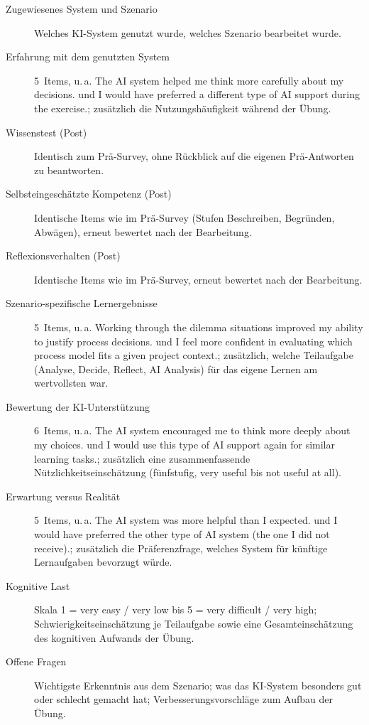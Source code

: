 \begin{description}
    \item[Zugewiesenes System und Szenario] Welches KI-System genutzt wurde, welches Szenario
    bearbeitet wurde.
    \item[Erfahrung mit dem genutzten System] 5~Items, u.\,a. \glqq The AI system helped me think
    more carefully about my decisions.\grqq{} und \glqq I would have preferred a different type of
    AI support during the exercise.\grqq{}; zusätzlich die Nutzungshäufigkeit während der Übung.
    \item[Wissenstest (Post)] Identisch zum Prä-Survey, ohne Rückblick auf die eigenen
    Prä-Antworten zu beantworten.
    \item[Selbsteingeschätzte Kompetenz (Post)] Identische Items wie im Prä-Survey (Stufen
    Beschreiben, Begründen, Abwägen), erneut bewertet nach der Bearbeitung.
    \item[Reflexionsverhalten (Post)] Identische Items wie im Prä-Survey, erneut bewertet nach der
    Bearbeitung.
    \item[Szenario-spezifische Lernergebnisse] 5~Items, u.\,a. \glqq Working through the dilemma
    situations improved my ability to justify process decisions.\grqq{} und \glqq I feel more
    confident in evaluating which process model fits a given project context.\grqq{}; zusätzlich,
    welche Teilaufgabe (Analyse, Decide, Reflect, AI Analysis) für das eigene Lernen am
    wertvollsten war.
    \item[Bewertung der KI-Unterstützung] 6~Items, u.\,a. \glqq The AI system encouraged me to
    think more deeply about my choices.\grqq{} und \glqq I would use this type of AI support again
    for similar learning tasks.\grqq{}; zusätzlich eine zusammenfassende Nützlichkeitseinschätzung
    (fünfstufig, \glqq very useful\grqq{} bis \glqq not useful at all\grqq{}).
    \item[Erwartung versus Realität] 5~Items, u.\,a. \glqq The AI system was more helpful than I
    expected.\grqq{} und \glqq I would have preferred the other type of AI system (the one I did
    not receive).\grqq{}; zusätzlich die Präferenzfrage, welches System für künftige Lernaufgaben
    bevorzugt würde.
    \item[Kognitive Last] Skala 1 = very easy / very low bis 5 = very difficult / very high;
    Schwierigkeitseinschätzung je Teilaufgabe sowie eine Gesamteinschätzung des kognitiven
    Aufwands der Übung.
    \item[Offene Fragen] Wichtigste Erkenntnis aus dem Szenario; was das KI-System besonders gut
    oder schlecht gemacht hat; Verbesserungsvorschläge zum Aufbau der Übung.
\end{description}

